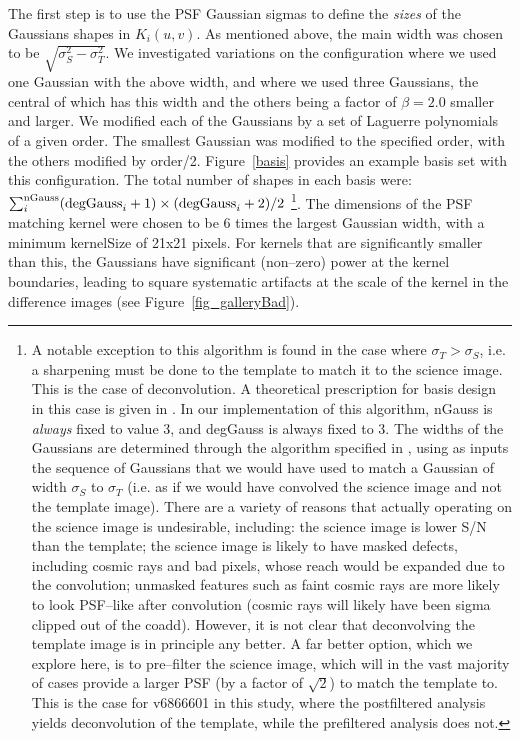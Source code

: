 \documentclass[prd, nofootinbib, floatfix, 11pt,tightenlines,times]{article}
\begin{document}

 The first step is to use the
PSF Gaussian sigmas to define the {\it sizes} of the Gaussians shapes
in $K_i(u,v)$.  As mentioned above, the main width was chosen to be
$\sqrt{\sigma_S^2 - \sigma_T^2}$.  We investigated variations on the
configuration where we used one Gaussian with the above width, and
where we used three Gaussians, the central of which has this width and
the others being a factor of $\beta = 2.0$ smaller and larger.  We
modified each of the Gaussians by a set of Laguerre polynomials of a
given order.  The smallest Gaussian was modified to the specified
order, with the others modified by order/2.  Figure~\ref{basis}
provides an example basis set with this configuration.  The total
number of shapes in each basis were: $\sum_i^{\rm nGauss} ({\rm
  degGauss}_i+1)\times({\rm degGauss}_i+2)/2$ \footnote{ A notable
  exception to this algorithm is found in the case where $\sigma_T >
  \sigma_S$, i.e. a sharpening must be done to the template to match
  it to the science image.  This is the case of deconvolution.  A
  theoretical prescription for basis design in this case is given in
  \cite{0266-5611-26-8-085002}.  In our implementation of this algorithm, nGauss is {\it
    always} fixed to value 3, and degGauss is always fixed to 3.  The
  widths of the Gaussians are determined through the algorithm
  specified in \cite{0266-5611-26-8-085002}, using as inputs the
  sequence of Gaussians that we would have used to match a Gaussian of
  width $\sigma_S$ to $\sigma_T$ (i.e. as if we would have convolved
  the science image and not the template image).  There are a variety
  of reasons that actually operating on the science image is
  undesirable, including: the science image is lower S/N than the
  template; the science image is likely to have masked defects,
  including cosmic rays and bad pixels, whose reach would be expanded
  due to the convolution; unmasked features such as faint cosmic rays
  are more likely to look PSF--like after convolution (cosmic rays
  will likely have been sigma clipped out of the coadd).  However, it
  is not clear that deconvolving the template image is in principle
  any better.  A far better option, which we explore here, is to
  pre--filter the science image, which will in the vast majority of
  cases provide a larger PSF (by a factor of $\sqrt{2}$) to match the
  template to.  This is the case for v6866601 in this study, where the
  postfiltered analysis yields deconvolution of the template, while
  the prefiltered analysis does not.  }.
The dimensions of the PSF matching kernel were chosen to be 6 times
the largest Gaussian width, with a minimum kernelSize of 21x21 pixels.
For kernels that are significantly smaller than this, the Gaussians
have significant (non--zero) power at the kernel boundaries, leading
to square systematic artifacts at the scale of the kernel in the
difference images (see Figure~\ref{fig_galleryBad}).
\end{document}
